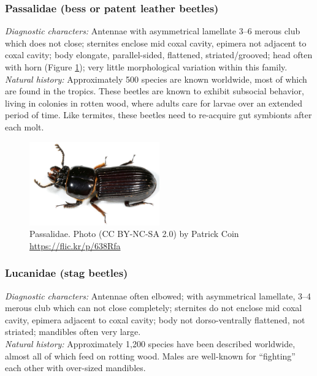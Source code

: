 \documentclass[letterpaper, 11pt]{article}
\begin{document}
\subsubsection{Passalidae (bess or patent leather beetles)}
\noindent{}\textit{Diagnostic characters:} Antennae with asymmetrical lamellate 3--6 merous club which does not close; sternites enclose mid coxal cavity, epimera not adjacent to coxal cavity; body elongate, parallel-sided, flattened, striated/grooved; head often with horn (Figure \ref{fig:passalid}); very little morphological variation within this family.\\

\noindent{}\textit{Natural history:} Approximately 500 species are known worldwide, most of which are found in the tropics. These beetles are known to exhibit subsocial behavior, living in colonies in rotten wood, where adults care for larvae over an extended period of time. Like termites, these beetles need to re-acquire gut symbionts after each molt.

\begin{figure}[ht!]
  \centering
    \includegraphics[width=0.5\textwidth]{PassalidHabitus}
  \caption{Passalidae. Photo (CC BY-NC-SA 2.0) by Patrick Coin \url{https://flic.kr/p/638Rfa}}
  \label{fig:passalid}
\end{figure}

\subsubsection{Lucanidae (stag beetles)}
\noindent{}\textit{Diagnostic characters:} Antennae often elbowed; with asymmetrical lamellate, 3--4 merous club which can not close completely; sternites do not enclose mid coxal cavity, epimera adjacent to coxal cavity; body not dorso-ventrally flattened, not striated; mandibles often very large.\\

\noindent{}\textit{Natural history:} Approximately 1,200 species have been described worldwide, almost all of which feed on rotting wood. Males are well-known for ``fighting'' each other with over-sized mandibles.
\end{document}
